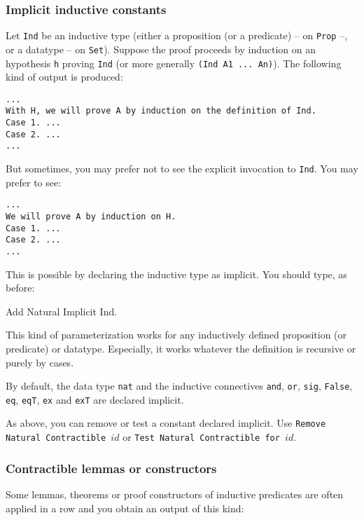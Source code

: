 \subsubsection*{Implicit inductive constants}

Let \verb=Ind= be an inductive type (either a proposition (or a
predicate) -- on \verb=Prop= --, or a datatype -- on \verb=Set=).
Suppose the proof proceeds by induction on an hypothesis \verb=h=
proving \verb=Ind= (or more generally \verb=(Ind A1 ... An)=). The
following kind of output is produced:

\begin{verbatim}
...
With H, we will prove A by induction on the definition of Ind.
Case 1. ...
Case 2. ...
...
\end{verbatim}

But sometimes, you may prefer not to see the explicit invocation to
\verb=Ind=. You may prefer to see:

\begin{verbatim}
...
We will prove A by induction on H.
Case 1. ...
Case 2. ...
...
\end{verbatim}

This is possible by declaring the inductive type as implicit. You should
type, as before:

\begin{coq_example*}
Add Natural Implicit Ind.
\end{coq_example*}

This kind of parameterization works for any inductively defined
proposition (or predicate) or datatype. Especially, it works whatever
the definition is recursive or purely by cases.

By default, the data type \verb=nat= and the inductive connectives
\verb=and=, \verb=or=, \verb=sig=, \verb=False=, \verb=eq=,
\verb=eqT=, \verb=ex= and \verb=exT= are declared implicit.

As above, you can remove or test a constant declared implicit.  Use
{\tt Remove Natural Contractible $id$} or {\tt Test Natural
Contractible for $id$}.


\subsubsection*{Contractible lemmas or constructors}

Some lemmas, theorems or proof constructors of inductive predicates are
often applied in a row and you obtain an output of this kind:

